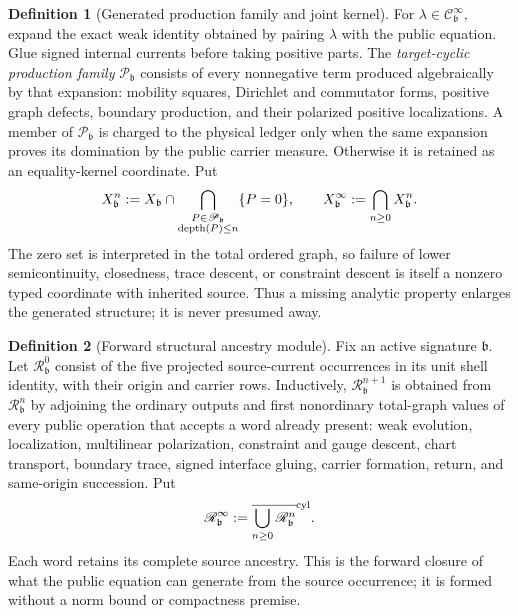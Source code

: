 \documentclass[11pt]{article}
\numberwithin{section}{part}
\theoremstyle{plain}
\theoremstyle{definition}
\newtheorem{definition}[definition]{Definition}
\theoremstyle{remark}
\begin{document}
\begin{definition}[Generated production family and joint kernel]
\label{def:generated-production-joint-kernel}
For \(\lambda\in\mathscr C^\infty_{\mathfrak b}\), expand the exact weak
identity obtained by pairing \(\lambda\) with the public equation.  Glue
signed internal currents before taking positive parts.  The
\emph{target-cyclic production family} \(\mathscr P_{\mathfrak b}\) consists
of every nonnegative term produced algebraically by that expansion:
mobility squares, Dirichlet and commutator forms, positive graph defects,
boundary production, and their polarized positive localizations.  A member
of \(\mathscr P_{\mathfrak b}\) is charged to the physical ledger only when
the same expansion proves its domination by the public carrier measure.
Otherwise it is retained as an equality-kernel coordinate.  Put
\begin{equation}
 \label{eq:target-cyclic-joint-kernel}
 X^n_{\mathfrak b}
 :=X_{\mathfrak b}\cap
   \bigcap_{\substack{P\in\mathscr P_{\mathfrak b}\cr
                      \operatorname{depth}(P)\leq n}}
   \{P=0\},
 \qquad
 X^\infty_{\mathfrak b}:=\bigcap_{n\geq0}X^n_{\mathfrak b}.
\end{equation}
The zero set is interpreted in the total ordered graph, so failure of lower
semicontinuity, closedness, trace descent, or constraint descent is itself a
nonzero typed coordinate with inherited source.  Thus a missing analytic
property enlarges the generated structure; it is never presumed away.
\end{definition}

\begin{definition}[Forward structural ancestry module]
\label{def:forward-structural-ancestry-module}
Fix an active signature \(\mathfrak b\).  Let
\(\mathscr R^0_{\mathfrak b}\) consist of the five projected source-current
occurrences in its unit shell identity, with their origin and carrier rows.
Inductively, \(\mathscr R^{n+1}_{\mathfrak b}\) is obtained from
\(\mathscr R^n_{\mathfrak b}\) by adjoining the ordinary outputs and first
nonordinary total-graph values of every public operation that accepts a word
already present: weak evolution, localization, multilinear polarization,
constraint and gauge descent, chart transport, boundary trace, signed
interface gluing, carrier formation, return, and same-origin succession.  Put
\begin{equation}
 \label{eq:forward-structural-ancestry-module}
 \mathscr R^\infty_{\mathfrak b}
 :=\overline{\bigcup_{n\ge0}\mathscr R^n_{\mathfrak b}}^{\rm cyl}.
\end{equation}
Each word retains its complete source ancestry.  This is the forward closure
of what the public equation can generate from the source occurrence; it is
formed without a norm bound or compactness premise.
\end{definition}
\end{document}
